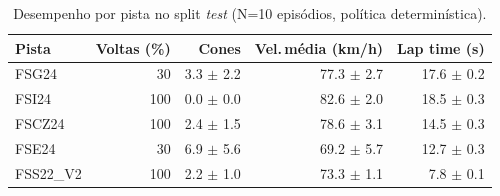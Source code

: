 \begin{table}[H]
\centering
\caption{Desempenho por pista no split \textit{test} (N=10 episódios, política determinística).}
\label{tab:per_track_test}
\begin{tabular}{lrrrr}
\toprule
\textbf{Pista} & \textbf{Voltas (\%)} & \textbf{Cones} & \textbf{Vel.\,m\'edia (km/h)} & \textbf{Lap time (s)} \\
\midrule
FSG24 & 30 & 3.3 $\pm$ 2.2 & 77.3 $\pm$ 2.7 & 17.6 $\pm$ 0.2 \\
FSI24 & 100 & 0.0 $\pm$ 0.0 & 82.6 $\pm$ 2.0 & 18.5 $\pm$ 0.3 \\
FSCZ24 & 100 & 2.4 $\pm$ 1.5 & 78.6 $\pm$ 3.1 & 14.5 $\pm$ 0.3 \\
FSE24 & 30 & 6.9 $\pm$ 5.6 & 69.2 $\pm$ 5.7 & 12.7 $\pm$ 0.3 \\
FSS22_V2 & 100 & 2.2 $\pm$ 1.0 & 73.3 $\pm$ 1.1 & 7.8 $\pm$ 0.1 \\
\bottomrule
\end{tabular}
\end{table}
